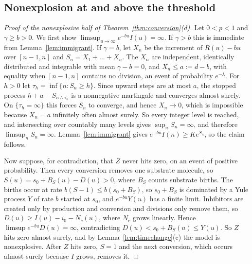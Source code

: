 \documentclass[11pt,a4paper]{article}
\numberwithin{equation}{section}
\theoremstyle{definition}\newtheorem{definition}[theorem]{Definition}
\theoremstyle{remark}\newtheorem{remark}[theorem]{Remark}\newtheorem{example}[theorem]{Example}
\begin{document}
\subsection{Nonexplosion at and above the threshold}\label{sec:nonexplosive}
\begin{proof}[Proof of the nonexplosive half of Theorem~\ref{thm:conversion}(d)]
Let $0<p<1$ and $\gamma\ge b>0$. We first show $\limsup_{u\to\infty}e^{-bu}I(u)=\infty$. If $\gamma>b$ this is immediate from Lemma~\ref{lem:immigrant}. If $\gamma=b$, let $X_n$ be the increment of $R(u)-bu$ over $[n-1,n]$ and $S_n=X_1+\dots+X_n$. The $X_n$ are independent, identically distributed and integrable with mean $\gamma-b=0$, and $X_n\le a:=d-b$, with equality when $[n-1,n]$ contains no division, an event of probability $e^{-\lambda}$. For $h>0$ let $\tau_h=\inf\{n:S_n\ge h\}$. Since upward steps are at most $a$, the stopped process $h+a-S_{n\wedge\tau_h}$ is a nonnegative martingale and converges almost surely. On $\{\tau_h=\infty\}$ this forces $S_n$ to converge, and hence $X_n\to0$, which is impossible because $X_n=a$ infinitely often almost surely. So every integer level is reached, and intersecting over countably many levels gives $\sup_nS_n=\infty$, and therefore $\limsup_nS_n=\infty$. Lemma~\ref{lem:immigrant} gives $e^{-bn}I(n)\ge Ke^{S_n}$, so the claim follows.

Now suppose, for contradiction, that $Z$ never hits zero, on an event of positive probability. Then every conversion removes one substrate molecule, so $S(u)=s_0+B_S(u)-D(u)>0$, where $B_S$ counts substrate births. The births occur at rate $b(S-1)\le b(s_0+B_S)$, so $s_0+B_S$ is dominated by a Yule process $Y$ of rate $b$ started at $s_0$, and $e^{-bu}Y(u)$ has a finite limit. Inhibitors are created only by production and conversion and divisions only remove them, so $D(u)\ge I(u)-i_0-N_c(u)$, where $N_c$ grows linearly. Hence $\limsup e^{-bu}D(u)=\infty$, contradicting $D(u)<s_0+B_S(u)\le Y(u)$. So $Z$ hits zero almost surely, and by Lemma~\ref{lem:timechange}(c) the model is nonexplosive. After $Z$ hits zero, $S=1$ and the next conversion, which occurs almost surely because $I$ grows, removes it.
\end{proof}
\end{document}
